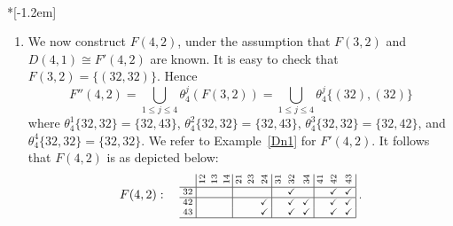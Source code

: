 \documentclass[ALCO,ThmDefs,Unicode,epreuves]{cedram}
\newcommand{\cm}{\checkmark}
\newcommand{\rt}[1]{\rotatebox{90}{#1}}
\begin{document}
\begin{exam}\label{ex:free-patterns}\ \\*[-1.2em]
\begin{enumerate}[label = (\alph*)]
\item \label{exam6.12_i} 
We now construct $F(4,2)$, under the assumption that $F(3,2)$ and
 $D(4,1) \cong F'(4,2)$ are known. It is easy to check that $F(3,2)
 = \{(32,32)\}$. Hence
\[
F''(4,2)=\bigcup_{1\leq j \leq 4}\theta^j_4(F(3,2)) =\bigcup_{1\leq j
 \leq 4}\theta^j_4\{(32),(32)\}
\]
where $\theta^1_4\{32,32\}= \{32,43\}$, $\theta^2_4\{32,32\}=
\{32,43\}$, $\theta^3_4\{32,32\}= \{32,42\}$, and
$\theta^4_4\{32,32\}= \{32,32\}$. We refer to Example~\ref{Dn1} for
$F'(4,2)$. It follows that $F(4,2)$ is as depicted below:
 \[ F(4,2): \quad
\text{\setlength{\arraycolsep}{2.7pt}\scriptsize
$\displaystyle 
\begin{array}{c|ccc|ccc|ccc|ccc|}
 &\rt{12}&\rt{13}&\rt{14}&\rt{21} &\rt{23}&\rt{24}&\rt{31}&\rt{32}
 &\rt{34}&\rt{41}&\rt{42}&\rt{43} \\ \hline
 32 &&&	&&&	&&\cm&	&&\cm&\cm\\ \hline
 42 &&&	&&&\cm	&&\cm&\cm	&&\cm&\cm\\ 
 43 &&&	&&&\cm	&&\cm&\cm	&&\cm&\cm\\ 
 \hline
\end{array}\; .$}
\]


\end{enumerate}
\end{exam}
\end{document}
